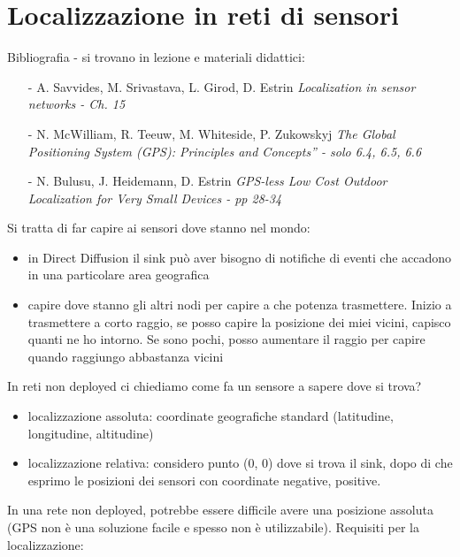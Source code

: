 \documentclass[12pt,italian]{report}
\begin{document}
\chapter{Localizzazione in reti di sensori}
\label{cap:positioning}
Bibliografia - si trovano in lezione e materiali didattici: 
\begin{itemize}
    \item[-]A. Savvides, M. Srivastava, L. Girod, D. Estrin 
    \textit{Localization in sensor networks - Ch. 15}
    \item[-]N. McWilliam, R. Teeuw, M. Whiteside, P. Zukowskyj
    \textit{The Global Positioning System (GPS): Principles and Concepts” - solo 6.4, 6.5, 6.6}
    \item[-]N. Bulusu, J. Heidemann, D. Estrin
    \textit{GPS-less Low Cost Outdoor Localization for Very Small Devices - pp 28-34}
\end{itemize}
\bigbreak
Si tratta di far capire ai sensori dove stanno nel mondo:
\begin{itemize}
    \item in Direct Diffusion il sink può aver bisogno di notifiche di eventi che accadono in una particolare area geografica 
    \item capire dove stanno gli altri nodi per capire a che potenza trasmettere. Inizio a trasmettere a corto raggio, se posso capire la posizione dei miei vicini, capisco quanti ne ho intorno. Se sono pochi, posso aumentare il raggio per capire quando raggiungo abbastanza vicini
\end{itemize}
In reti non deployed ci chiediamo come fa un sensore a sapere dove si trova?
\begin{itemize}
    \item localizzazione assoluta: coordinate geografiche standard (latitudine, longitudine, altitudine)
    \item localizzazione relativa: considero punto (0, 0) dove si trova il sink, dopo di che esprimo le posizioni dei sensori con coordinate negative, positive.
\end{itemize}
In una rete non deployed, potrebbe essere difficile avere una posizione assoluta (GPS non è una soluzione facile e spesso non è utilizzabile). 
\bigbreak
Requisiti per la localizzazione:
\end{document}
